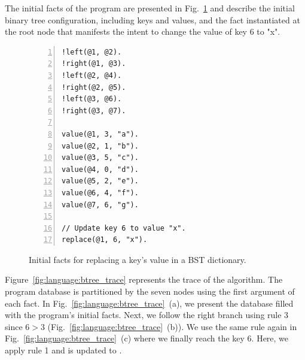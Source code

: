 The initial facts of the program are presented in
Fig.~\ref{code:language:btree_replace_initial} and describe the initial binary
tree configuration, including keys and values, and the  fact instantiated at the root node  that manifests the intent to
change the value of key 6 to "x".

\begin{figure}[ht]
\begin{Verbatim}[numbers=left,fontsize=\codesize,commandchars=\*\{\}]
!left(@1, @2).
!right(@1, @3).
!left(@2, @4).
!right(@2, @5). 
!left(@3, @6).
!right(@3, @7).

value(@1, 3, "a").
value(@2, 1, "b").
value(@3, 5, "c").
value(@4, 0, "d").
value(@5, 2, "e").
value(@6, 4, "f").
value(@7, 6, "g").

// Update key 6 to value "x".
replace(@1, 6, "x").
\end{Verbatim}
\caption{Initial facts for replacing a key's value in a BST dictionary.}
\label{code:language:btree_replace_initial}
\end{figure}

Figure~\ref{fig:language:btree_trace} represents the trace of the algorithm. The program
database is partitioned by the seven nodes using the first argument of each
fact. In Fig.~\ref{fig:language:btree_trace}~(a), we present the database filled with the
program's initial facts. Next, we follow the right branch using rule 3 since $6
> 3$ (Fig.~\ref{fig:language:btree_trace}~(b)).  We use the same rule again in
Fig.~\ref{fig:language:btree_trace}~(c) where we finally reach the key 6. Here, we apply
rule 1 and  is updated to .

